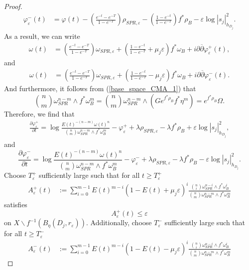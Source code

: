 \documentclass[12pt]{article}
\numberwithin{equation}{section}
\renewcommand{\d}{\partial}
\newcommand{\dbar}{\overline{\partial}}
\newcommand{\e}{\varepsilon}
\begin{document}
\begin{proof}
\begin{align*}
    \varphi_{\e}^{-}(t) &= \varphi(t) - \left(\frac{e^{-t}-e^{-T}}{1-e^{-T}}\right) \rho_{SPR,\e} - \left(\frac{1-e^{-t}}{1-e^{-T}}\right) f^*\rho_{B} - \e \log|s_j|_{h_{D_j}}^2.
\end{align*}
As a result, we can write
\begin{align*}
    \omega(t) &= \left(\frac{e^{-t}-e^{-T}}{1-e^{-T}}\right) \omega_{SPR, \e} + \left(\frac{1-e^{-t}}{1-e^{-T}} + \mu_j\e\right) f^* \omega_B+ i\d\dbar\varphi_{\e}^+(t),
\end{align*}
and
\begin{align*}
    \omega(t) &= \left(\frac{e^{-t}-e^{-T}}{1-e^{-T}}\right) \omega_{SPR, \e} + \left(\frac{1-e^{-t}}{1-e^{-T}} - \mu_j\e\right) f^* \omega_B+ i\d\dbar\varphi_{\e}^{-}(t).
\end{align*}
And furthermore, it follows from (\ref{base_space_CMA_1}) that
\begin{equation*}
     {n \choose m} \omega_{SPR}^{n-m} \wedge f^* \omega_B^m =  {n \choose m} \omega_{SPR}^{n-m} \wedge (G e^{f^*\rho_B} f^* \eta^{m}) = e^{f^* \rho_B} \Omega.
\end{equation*}
Therefore, we find that
\begin{align*}
    \frac{\d \varphi_{\e}^+}{\d t} = \log \frac{E(t)^{-(n-m)} \omega(t)^n}{{n \choose m} \omega_{SPR}^{n-m} \wedge f^* \omega_B^m} - \varphi_{\e}^{+} + \lambda \rho_{SPR,\e} - \lambda f^* \rho_B + \e \log |s_j|^2_{h_{D_j}},
\end{align*}
and
\begin{equation*}
    \frac{\d \varphi_{\e}^-}{\d t} = \log \frac{E(t)^{-(n-m)} \omega(t)^n}{{n \choose m} \omega_{SPR}^{n-m} \wedge f^* \omega_B^m} - \varphi_{\e}^{-} + \lambda \rho_{SPR,\e} - \lambda f^* \rho_B - \e \log |s_j|^2_{h_{D_j}}.
\end{equation*}
Choose $T^+_{\e}$ sufficiently large such that for all $t \geq T^+_{\e}$
\begin{align*}
    A_{\e}^{+}(t)&:= \sum_{i=0}^{m-1} E(t)^{m-i}(1-E(t)+\mu_j\e)^i \frac{{n\choose i}\omega_{SPR}^{n-i} \wedge f^* \omega_B^i}{{n\choose m} \omega_{SPR}^{n-m} \wedge f^*\omega_B^m}
\end{align*}
satisfies
\begin{equation*}
    A_{\e}^+(t) \leq \e
\end{equation*}
on $X \backslash f^{-1}(B_{\eta}(D_j,r_\e))$. Additionally, choose $T^-_{\e}$ sufficiently large such that for all $t \geq T^-_{\e}$
\begin{align*}
    A_{\e}^{-}(t) &:= \sum_{i=0}^{m-1} E(t)^{m-i}(1-E(t)-\mu_j\e)^i \frac{{n\choose i}\omega_{SPR}^{n-i} \wedge f^* \omega_B^i}{{n\choose m} \omega_{SPR}^{n-m} \wedge f^*\omega_B^m}

\end{align*}
\end{proof}
\end{document}
